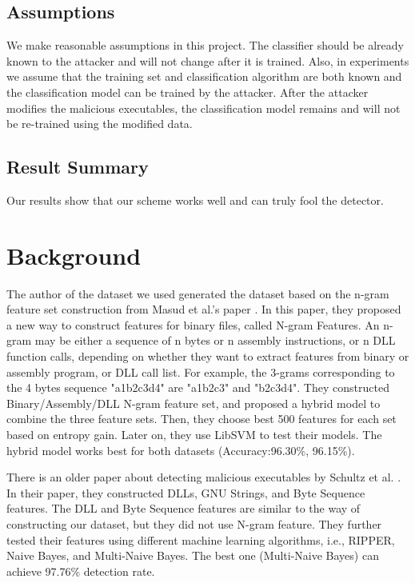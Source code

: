 \documentclass[11pt]{article}
\begin{document}
\subsection{Assumptions} \label{sec:assumption}
We make reasonable assumptions in this project. The classifier should be already known to the attacker and will not change after it is trained. Also, in experiments we assume that the training set and classification algorithm are both known and the classification model can be trained by the attacker. After the attacker modifies the malicious executables, the classification model remains and will not be re-trained using the modified data.


\subsection{Result Summary}
Our results show that our scheme works well and can truly fool the detector.

\section{Background}
The author of the dataset we used generated the dataset based on the n-gram feature set construction from Masud et al.'s paper \cite{masud2007hybrid}. In this paper, they proposed a new way to construct features for binary files, called N-gram Features. An n-gram may be either a sequence of n bytes or n assembly instructions, or n DLL function calls, depending on whether they want to extract features from binary or assembly program, or DLL call list. For example, the 3-grams corresponding to the 4 bytes sequence "a1b2c3d4" are "a1b2c3" and "b2c3d4". They constructed Binary/Assembly/DLL N-gram feature set, and proposed a hybrid model to combine the three feature sets. Then, they choose best 500 features for each set based on entropy gain. Later on, they use LibSVM to test their models. The hybrid model works best for both datasets (Accuracy:96.30\%, 96.15\%).

There is an older paper about detecting malicious executables by Schultz et al. \cite{schultz2001data}. In their paper, they constructed DLLs, GNU Strings, and Byte Sequence features. The DLL and Byte Sequence features are similar to the way of constructing our dataset, but they did not use N-gram feature. They further tested their features using different machine learning algorithms, i.e., RIPPER, Naive Bayes, and Multi-Naive Bayes. The best one (Multi-Naive Bayes) can achieve 97.76\% detection rate.
\end{document}
